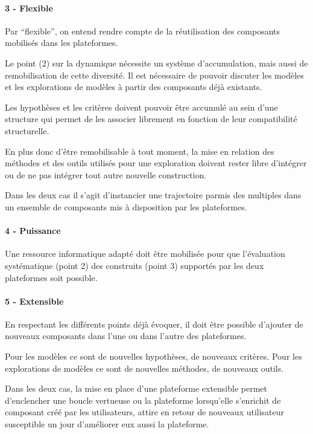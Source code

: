 
\paragraph{3 - Flexible}

Par \enquote{flexible}, on entend rendre compte de la réutilisation des composants mobilisés dans les plateformes. 

Le point (2) sur la dynamique nécessite un système d'accumulation, mais aussi de remobilisation de cette diversité. Il est nécessaire de pouvoir discuter les modèles et les explorations de modèles à partir des composants déjà existants.

Les hypothèses et les critères doivent pouvoir être accumulé au sein d'une structure qui permet de les associer librement en fonction de leur compatibilité structurelle. 

En plus donc d'être remobilisable à tout moment, la mise en relation des méthodes et des outils utilisés pour une exploration doivent rester libre d'intégrer ou de ne pas intégrer tout autre nouvelle construction.

Dans les deux cas il s'agit d'instancier une trajectoire parmis des multiples dans un ensemble de composants mis à disposition par les plateformes.

\paragraph{4 - Puissance}

Une ressource informatique adapté doit être mobilisée pour que l'évaluation systématique (point 2) des construits (point 3) supportés par les deux plateformes  soit possible.

\paragraph{5 - Extensible}

En respectant les différents points déjà évoquer, il doit être possible d'ajouter de nouveaux composants dans l'une ou dans l'autre des plateformes.

Pour les modèles ce sont de nouvelles hypothèses, de nouveaux critères. Pour les explorations de modèles ce sont de nouvelles méthodes, de nouveaux outils.

Dans les deux cas, la mise en place d'une plateforme extensible permet d'enclencher une boucle vertueuse ou la plateforme lorsqu'elle s'enrichit de composant créé par les utilisateurs, attire en retour de nouveaux utilisateur susceptible un jour d'améliorer eux aussi la plateforme.

